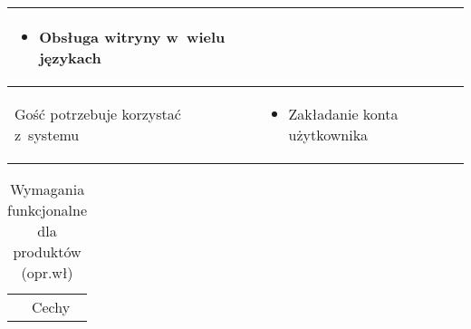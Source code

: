 \begin{minipage}{\textwidth}
\begin{table}[H]
\begin{tabular}{|P{.3\textwidth}|P{.6\textwidth}|}
\begin{itemize}
                \item Obsługa witryny w~wielu językach
            \end{itemize} \\
            \hline
            Gość potrzebuje korzystać z~systemu &
            \begin{itemize}
                \item Zakładanie konta użytkownika
            \end{itemize} \\
            \hline
        \end{tabular}
    \end{table}
\end{minipage}

\begin{minipage}{\textwidth}
    \begin{table}[H]
        \centering\caption{Wymagania funkcjonalne dla produktów (opr.wł)\label{tabela:wymaganiaFunkcjonalneProdukty}}
        \begin{tabular}{|P{.3\textwidth}|P{.6\textwidth}|}
            \hline
             & Cechy \\


\end{tabular}
\end{table}
\end{minipage}
